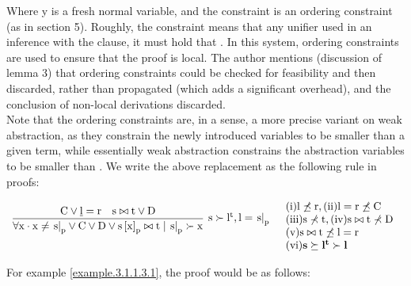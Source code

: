 \bigskip

\noindent
{}


\bigskip

\noindent
Where y is a fresh normal variable, and the constraint  is an ordering constraint (as in \cite{DBLP:books/el/RV01/NieuwenhuisR01} section 5). Roughly, the constraint means that any unifier \m{\sigma} used in an inference with the clause, it must hold that . In this system, ordering constraints are used to ensure that the proof is local. The author mentions (discussion of lemma 3) that ordering constraints could be checked for feasibility and then discarded, rather than propagated (which adds a significant overhead), and the conclusion of non-local derivations discarded.\\
Note that the ordering constraints are, in a sense, a more precise variant on weak abstraction, as they constrain the newly introduced variables to be smaller than a given term, while essentially weak abstraction constrains the abstraction variables to be smaller than .
We write the above replacement as the following rule in proofs:

\bigskip

\noindent
\[
\begin{array}{llll}
\infer[\m{s \succ l^t,l = \termAt{s}{p}}]
{\m{\forall x \cdot x \neq \termAt{s}{p} \lor C \lor D \lor \termRepAt{s}{x}{p} \bowtie t \mid \termAt{s}{p} \succ x}}
{
	\m{C \lor \underline{l}=r} &
	\m{s \bowtie t \lor D}
} &
\begin{array}{ll}
	\m{\sci{1} l \not\preceq r, \sci{2} l=r \not\preceq C}\\
	\m{\sci{3} s \not\prec t, \sci{4} s\bowtie t \not\prec D}\\
	\m{\sci{5} s \bowtie t \not\preceq l=r}\\
	\m{\sci{6} \mathbf{s \succeq l^t \succ l}}
\end{array}	\\

\end{array}
\]

\bigskip


\noindent
For example \ref{example.3.1.1.3.1}, the proof would be as follows:


